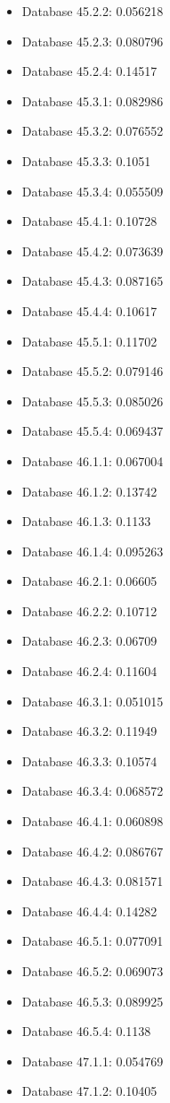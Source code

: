 \begin{itemize}
\item Database 45.2.2: 0.056218
\item Database 45.2.3: 0.080796
\item Database 45.2.4: 0.14517
\item Database 45.3.1: 0.082986
\item Database 45.3.2: 0.076552
\item Database 45.3.3: 0.1051
\item Database 45.3.4: 0.055509
\item Database 45.4.1: 0.10728
\item Database 45.4.2: 0.073639
\item Database 45.4.3: 0.087165
\item Database 45.4.4: 0.10617
\item Database 45.5.1: 0.11702
\item Database 45.5.2: 0.079146
\item Database 45.5.3: 0.085026
\item Database 45.5.4: 0.069437
\item Database 46.1.1: 0.067004
\item Database 46.1.2: 0.13742
\item Database 46.1.3: 0.1133
\item Database 46.1.4: 0.095263
\item Database 46.2.1: 0.06605
\item Database 46.2.2: 0.10712
\item Database 46.2.3: 0.06709
\item Database 46.2.4: 0.11604
\item Database 46.3.1: 0.051015
\item Database 46.3.2: 0.11949
\item Database 46.3.3: 0.10574
\item Database 46.3.4: 0.068572
\item Database 46.4.1: 0.060898
\item Database 46.4.2: 0.086767
\item Database 46.4.3: 0.081571
\item Database 46.4.4: 0.14282
\item Database 46.5.1: 0.077091
\item Database 46.5.2: 0.069073
\item Database 46.5.3: 0.089925
\item Database 46.5.4: 0.1138
\item Database 47.1.1: 0.054769
\item Database 47.1.2: 0.10405

\end{itemize}
